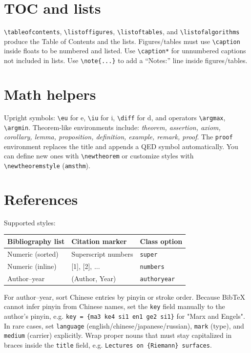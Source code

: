 \documentclass[12pt]{article}
\begin{document}
\section{TOC and lists}
\verb|\tableofcontents|, \verb|\listoffigures|, \verb|\listoftables|, and \verb|\listofalgorithms| produce the Table of Contents and the lists. Figures/tables must use \verb|\caption| inside floats to be numbered and listed. Use \verb|\caption*| for unnumbered captions not included in lists. Use \verb|\note{...}| to add a “Notes:” line inside figures/tables.

\section{Math helpers}
Upright symbols: \verb|\eu| for $\mathrm{e}$, \verb|\iu| for $\mathrm{i}$, \verb|\diff| for $\mathrm{d}$, and operators \verb|\argmax|, \verb|\argmin|. Theorem-like environments include: \emph{theorem, assertion, axiom, corollary, lemma, proposition, definition, example, remark, proof}. The \verb|proof| environment replaces the title and appends a QED symbol automatically. You can define new ones with \verb|\newtheorem| or customize styles with \verb|\newtheoremstyle| (\texttt{amsthm}).

\section{References}
Supported styles:
\begin{center}
\begin{tabular}{@{}lll@{}}
\toprule
Bibliography list & Citation marker & Class option\\
\midrule
Numeric (sorted) & Superscript numbers & \texttt{super}\\
Numeric (inline) & [1], [2], ... & \texttt{numbers}\\
Author–year & (Author, Year) & \texttt{authoryear}\\
\bottomrule
\end{tabular}
\end{center}
For author–year, sort Chinese entries by pinyin or stroke order. Because Bib\TeX{} cannot infer pinyin from Chinese names, set the \texttt{key} field manually to the author’s pinyin, e.g. \verb|key = {ma3 ke4 si1 en1 ge2 si1}| for "Marx and Engels". In rare cases, set \verb|language| (english/chinese/japanese/russian), \verb|mark| (type), and \verb|medium| (carrier) explicitly.
Wrap proper nouns that must stay capitalized in braces inside the \texttt{title} field, e.g. \verb|Lectures on {Riemann} surfaces|.
\end{document}
